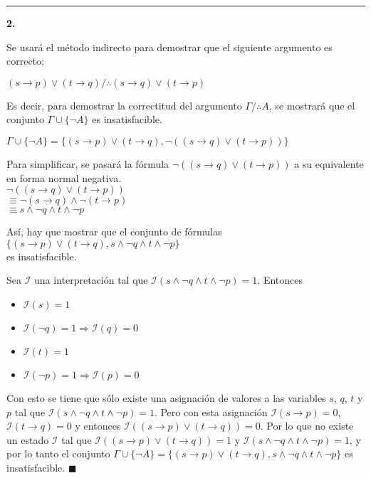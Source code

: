 \documentclass{article}
\begin{document}
\vspace{5mm}

\rule{11.5cm}{0.1mm}

\textbf{2.}

Se usará el método indirecto para demostrar que el siguiente argumento es correcto:

$(s \rightarrow p) \lor (t \rightarrow q) / \therefore (s \rightarrow q) \lor (t \rightarrow p)$

Es decir, para demostrar la correctitud del argumento $\Gamma / \therefore A$, se mostrará que el conjunto $\Gamma \cup \{ \lnot A \}$ es insatisfacible.

$\Gamma \cup \{ \lnot A \} = \{ (s \rightarrow p) \lor (t \rightarrow q), \lnot ((s \rightarrow q) \lor (t \rightarrow p)) \}$

Para simplificar, se pasará la fórmula $\lnot ((s \rightarrow q) \lor (t \rightarrow p))$ a su equivalente en forma normal negativa.\\
$\lnot ((s \rightarrow q) \lor (t \rightarrow p))$\\
$\equiv \lnot (s \rightarrow q) \land \lnot (t \rightarrow p)$\\
$\equiv s \land \lnot q \land t \land \lnot p$

Así, hay que mostrar que el conjunto de fórmulas\\
$\{ (s \rightarrow p) \lor (t \rightarrow q), s \land \lnot q \land t \land \lnot p \}$\\
es insatisfacible.

Sea $\mathcal{I}$ una interpretación tal que $\mathcal{I} (s \land \lnot q \land t \land \lnot p) = 1$. Entonces

\begin{itemize}
\item $\mathcal{I}(s) = 1$
\item $\mathcal{I}(\lnot q) = 1 \Rightarrow \mathcal{I}(q) = 0$
\item $\mathcal{I}(t) = 1$
\item $\mathcal{I}(\lnot p) = 1 \Rightarrow \mathcal{I}(p) = 0$
\end{itemize}

Con esto se tiene que sólo existe una asignación de valores a las variables $s$, $q$, $t$ y $p$ tal que $\mathcal{I} (s \land \lnot q \land t \land \lnot p) = 1$. Pero con esta asignación $\mathcal{I}(s \rightarrow p) = 0$, $\mathcal{I}(t \rightarrow q) = 0$ y entonces $\mathcal{I}((s \rightarrow p) \lor (t \rightarrow q)) = 0$. Por lo que no existe un estado $\mathcal{I}$ tal que $\mathcal{I}((s \rightarrow p) \lor (t \rightarrow q)) = 1$ y $\mathcal{I}(s \land \lnot q \land t \land \lnot p) = 1$, y por lo tanto el conjunto $\Gamma \cup \{ \lnot A \} = \{ (s \rightarrow p) \lor (t \rightarrow q), s \land \lnot q \land t \land \lnot p \}$ es insatisfacible. $\blacksquare$
\end{document}

